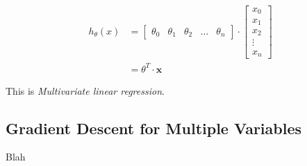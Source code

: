             \begin{equation}
                \begin{split}
                 h_\theta (x) &= \left[ \begin{array}{ccccc}
                                                \theta_0 & \theta_1 & \theta_2 & \dots & \theta_n 
        \end{array} 
                                    \right] \cdot \left[ \begin{array}{c}
                                                                x_0 \\
                                                                x_1 \\
                                                                x_2 \\
                                                                \vdots \\
                                                                x_n
                                                                 \end{array} \right] \\
                                                                 & = \theta^T\cdot \textbf{x}
            \end{split}
        \end{equation}
        

        This is \emph{Multivariate linear regression}.










    \subsection{Gradient Descent for Multiple Variables}

    Blah
